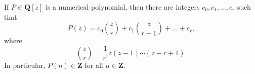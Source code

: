 If $P \in \mathbf{Q}[z]$ is a numerical polynomial, then there are integers $c_0, c_1, \ldots, c_r$ such that
$$P(z) = c_0 \binom{z}{r} + c_1 \binom{z}{r-1} + \ldots + c_r,$$
where
$$\binom{z}{r} = \frac{1}{r!} z(z-1) \cdots (z-r+1).$$
In particular, $P(n) \in \mathbf{Z}$ for all $n \in \mathbf{Z}$.
